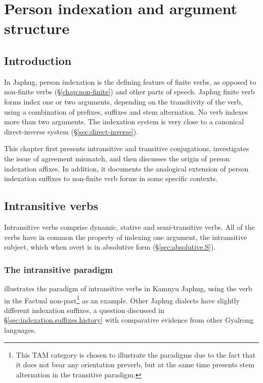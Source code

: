 \chapter{Person indexation and argument structure} \label{chap:indexation}

\section{Introduction}  
In Japhug, person indexation is the defining feature of finite verbs, as opposed to non-finite verbs (§\ref{chap:non-finite}) and other parts of speech. Japhug finite verb forms index one or two arguments, depending on the transitivity of the verb, using a combination of prefixes, suffixes and stem alternation. No verb indexes more than two arguments. The indexation system is very close to a canonical direct-inverse system (§\ref{sec:direct-inverse}).

This chapter first presents intransitive and transitive conjugations, investigates the issue of agreement mismatch, and then discusses the origin of person indexation affixes. In addition, it documents the analogical extension of person indexation suffixes to non-finite verb forms in some specific contexts.

\section{Intransitive verbs} \label{sec:intr.indexation}
Intransitive verbs comprise dynamic, stative and semi-transitive verbs. All of the verbs have in common the property of indexing one argument, the intransitive subject, which when overt is in absolutive form (§\ref{sec:absolutive.S}).

\subsection{The intransitive paradigm} \label{sec:intransitive.paradigm}
 illustrates the paradigm of intransitive verbs in Kamnyu Japhug, using the verb  in the Factual non-past\footnote{This TAM category is chosen to illustrate the paradigms due to the fact that it does not bear any orientation preverb, but at the same time presents stem alternation in the transitive paradigm.} as an example. Other Japhug dialects have slightly different indexation suffixes, a question discussed in §\ref{sec:indexation.suffixes.history} with comparative evidence from other Gyalrong languages.

